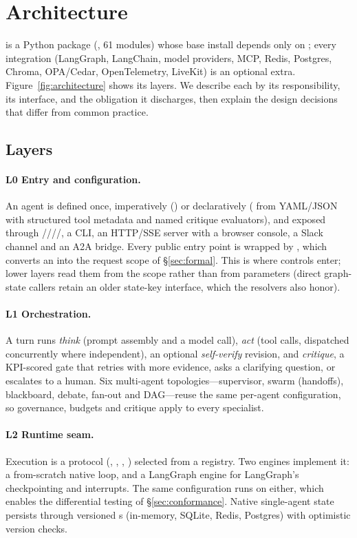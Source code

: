 \section{Architecture}
\label{sec:architecture}

\method{} is a Python package (, 61 modules) whose base install depends only on ; every integration (LangGraph, LangChain, model providers, MCP, Redis, Postgres, Chroma, OPA/Cedar, OpenTelemetry, LiveKit) is an optional extra. Figure~\ref{fig:architecture} shows its layers. We describe each by its responsibility, its interface, and the \gec{} obligation it discharges, then explain the design decisions that differ from common practice.

\subsection{Layers}
\paragraph{L0 Entry and configuration.} An agent is defined once, imperatively () or declaratively ( from YAML/JSON with structured tool metadata and named critique evaluators), and exposed through ////, a CLI, an HTTP/SSE server with a browser console, a Slack channel and an A2A bridge. Every public entry point is wrapped by , which converts an  into the request scope of \S\ref{sec:formal}. This is where controls enter; lower layers read them from the scope rather than from parameters (direct graph-state callers retain an older state-key interface, which the resolvers also honor).

\paragraph{L1 Orchestration.} A turn runs \emph{think} (prompt assembly and a model call), \emph{act} (tool calls, dispatched concurrently where independent), an optional \emph{self-verify} revision, and \emph{critique}, a KPI-scored gate that retries with more evidence, asks a clarifying question, or escalates to a human. Six multi-agent topologies---supervisor, swarm (handoffs), blackboard, debate, fan-out and DAG---reuse the same per-agent configuration, so governance, budgets and critique apply to every specialist.

\paragraph{L2 Runtime seam.} Execution is a  protocol (, , , ) selected from a registry. Two engines implement it: a from-scratch native loop, and a LangGraph  engine for LangGraph's checkpointing and interrupts. The same configuration runs on either, which enables the differential testing of \S\ref{sec:conformance}. Native single-agent state persists through versioned s (in-memory, SQLite, Redis, Postgres) with optimistic version checks.

